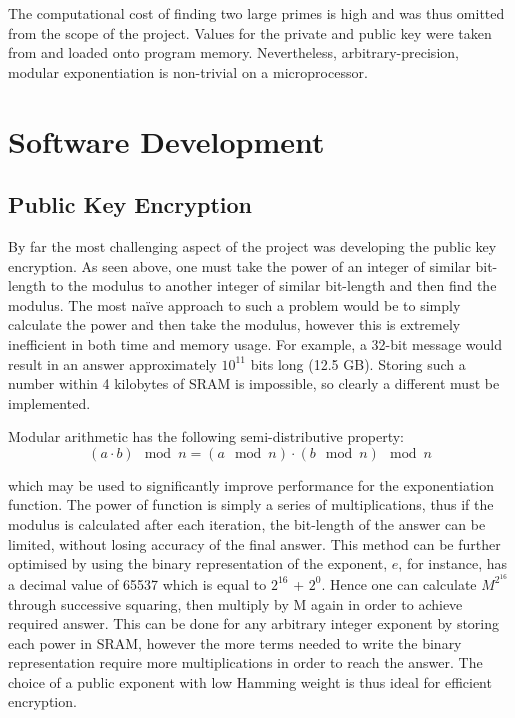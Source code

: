 \documentclass[a4paper,11pt,twocolumn]{article}
\begin{document}
	The computational cost of finding two large primes is high and was thus omitted from the scope of the project. Values for the private and public key were taken from \cite{RSAkey} and loaded onto program memory. Nevertheless, arbitrary-precision, modular exponentiation is non-trivial on a microprocessor.
	
	\section{Software Development}
	\subsection{Public Key Encryption}
	By far the most challenging aspect of the project was developing the public key encryption. As seen above, one must take the power of an integer of similar bit-length to the modulus to another integer of similar bit-length and then find the modulus. The most na\"ive approach to such a problem would be to simply calculate the power and then take the modulus, however this is extremely inefficient in both time and memory usage. For example, a 32-bit message would result in an answer approximately $10^{11}$ bits long (12.5 GB). Storing such a number within 4 kilobytes of SRAM is impossible, so clearly a different must be implemented. 
	
	Modular arithmetic has the following semi-distributive property:
	\begin{equation}
		\left(a\cdot b\right) \mod n = \left(a \mod n\right)\cdot\left(b \mod n\right) \mod n
	\end{equation}
	
	which may be used to significantly improve performance for the exponentiation function. The power of function is simply a series of multiplications, thus if the modulus is calculated after each iteration, the bit-length of the answer can be limited, without losing accuracy of the final answer. This method can be further optimised by using the binary representation of the exponent, $e$, for instance, has a decimal value of 65537 which is equal to $2^{16}$ + $2^0$. Hence one can calculate $M^{2^{16}}$ through successive squaring, then multiply by M again in order to achieve required answer. This can be done for any arbitrary integer exponent by storing each power in SRAM, however the more terms needed to write the binary representation require more multiplications in order to reach the answer. The choice of a public exponent with low Hamming weight\cite{knuth2009art} is thus ideal for efficient encryption.
	
\end{document}
